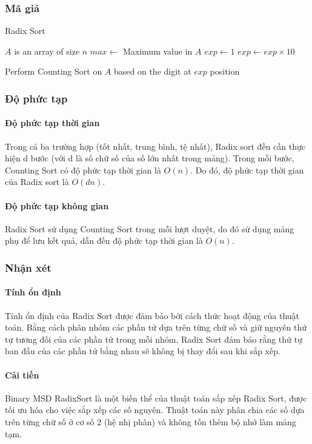 \subsubsection{Mã giả}
 
\begin{algorithm}[H]
\caption{Radix Sort}
\label{alg:radix-sort}
\begin{algorithmic}

\Require $A$ is an array of size $n$
\State $max \gets$ Maximum value in $A$
\State $exp \gets 1$
    \State $exp \gets exp \times 10$
\EndWhile
\EndFunction

\State Perform Counting Sort on $A$ based on the digit at $exp$ position
\EndFunction

\end{algorithmic}
\end{algorithm}


\subsubsection{Độ phức tạp}

\paragraph{Độ phức tạp thời gian}
Trong cả ba trường hợp (tốt nhất, trung bình, tệ nhất), Radix sort đều cần thực hiện d bước (với d là số chữ số của số lớn nhất trong mảng). Trong mỗi bước, Counting Sort có độ phức tạp thời gian là $O(n)$. Do đó, độ phức tạp thời gian của Radix sort là $O(dn)$.

\paragraph{Độ phức tạp không gian}

Radix Sort sử dụng Counting Sort trong mỗi lượt duyệt, do đó sử dụng mảng phụ để lưu kết quả, dẫn đến độ phức tạp thời gian là $O(n)$.

\subsubsection{Nhận xét}

\paragraph{Tính ổn định}
Tính ổn định của Radix Sort được đảm bảo bởi cách thức hoạt động của thuật toán. Bằng cách phân nhóm các phần tử dựa trên từng chữ số và giữ nguyên thứ tự tương đối của các phần tử trong mỗi nhóm, Radix Sort đảm bảo rằng thứ tự ban đầu của các phần tử bằng nhau sẽ không bị thay đổi sau khi sắp xếp.

\paragraph{Cải tiến}
Binary MSD RadixSort là một biến thể của thuật toán sắp xếp Radix Sort, được tối ưu hóa cho việc sắp xếp các số nguyên. Thuật toán này phân chia các số dựa trên từng chữ số ở cơ số 2 (hệ nhị phân) và không tốn
thêm bộ nhớ làm mảng tạm.
